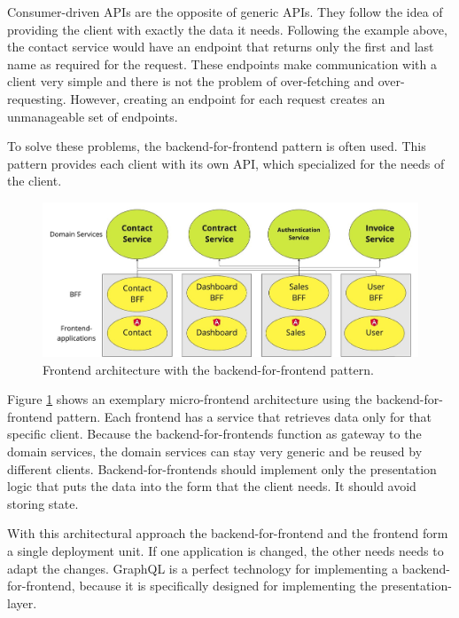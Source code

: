 Consumer-driven APIs are the opposite of generic APIs. They follow the idea of providing the client with exactly the data it needs. Following the example above, the contact service would have an endpoint that returns only the first and last name as required for the request. These endpoints make communication with a client very simple and there is not the problem of over-fetching and over-requesting. However, creating an endpoint for each request creates an unmanageable set of endpoints. \cite{misc:2019:leitner:backend-for-frontends}


To solve these problems, the backend-for-frontend pattern is often used. This pattern provides each client with its own API, which specialized for the needs of the client. \cite{book:2018:richardson:background:bff:microservices-patterns}

\ifshowImages
\begin{figure}[H]
\centering
\includegraphics[width=0.8\linewidth]{images/ui-bff-architecture.jpeg}
\caption{Frontend architecture with the backend-for-frontend pattern.}\label{figure:state-of-the-art:ui-bff-architecture}
\end{figure}
\fi

Figure \ref{figure:state-of-the-art:ui-bff-architecture} shows an exemplary micro-frontend architecture using the backend-for-frontend pattern. Each frontend has a service that retrieves data only for that specific client. Because the backend-for-frontends function as gateway to the domain services, the domain services can stay very generic and be reused by different clients. Backend-for-frontends should implement only the presentation logic that puts the data into the form that the client needs. It should avoid storing state. \cite{misc:2019:leitner:backend-for-frontends}

With this architectural approach the backend-for-frontend and the frontend form a single deployment unit. If one application is changed, the other needs needs to adapt the changes. GraphQL is a perfect technology for implementing a backend-for-frontend, because it is specifically designed for implementing the presentation-layer.

